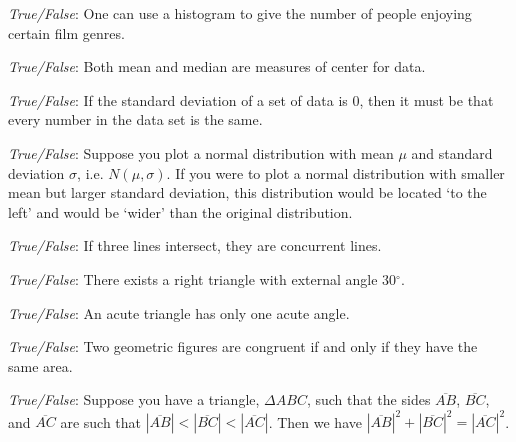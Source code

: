 \documentclass[11pt,letterpaper]{article}
\begin{document}
\quizsol \textit{True/False}:  One can use a histogram to give the number of people enjoying certain film genres.

\quizsol \textit{True/False}: Both mean and median are measures of center for data. 

\quizsol \textit{True/False}: If the standard deviation of a set of data is 0, then it must be that every number in the data set is the same.

\quizsol \textit{True/False}: Suppose you plot a normal distribution with mean $\mu$ and standard deviation $\sigma$, i.e. $N(\mu, \sigma)$. If you were to plot a normal distribution with smaller mean but larger standard deviation, this distribution would be located ‘to the left’ and would be ‘wider’ than the original distribution.

\quizsol \textit{True/False}: If three lines intersect, they are concurrent lines.

\quizsol \textit{True/False}: There exists a right triangle with external angle 30$^\circ$. 

\quizsol \textit{True/False}: An acute triangle has only one acute angle. 

\quizsol \textit{True/False}: Two geometric figures are congruent if and only if they have the same area.

\quizsol \textit{True/False}: Suppose you have a triangle, $\Delta ABC$, such that the sides $\overline{AB}$, $\overline{BC}$, and $\overline{AC}$ are such that $|\overline{AB}| < |\overline{BC}| < |\overline{AC}|$. Then we have $|\overline{AB}|^2 + |\overline{BC}|^2= |\overline{AC}|^2$. 
\end{document}
